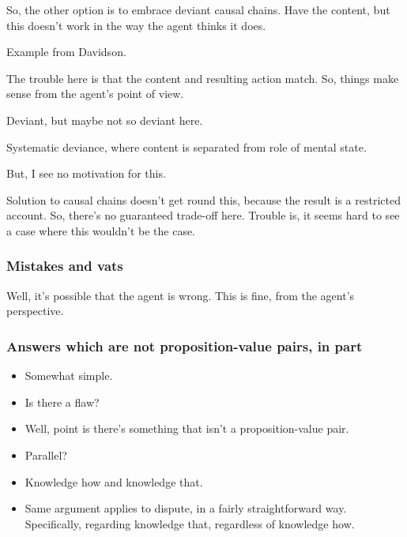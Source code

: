 \begin{note}
  So, the other option is to embrace deviant causal chains.
  Have the content, but this doesn't work in the way the agent thinks it does.

  Example from Davidson.

  The trouble here is that the content and resulting action match.
  So, things make sense from the agent's point of view.

  Deviant, but maybe not so deviant here.

  Systematic deviance, where content is separated from role of mental state.

  But, I see no motivation for this.

  Solution to causal chains doesn't get round this, because the result is a restricted account.
  So, there's no guaranteed trade-off here.
  Trouble is, it seems hard to see a case where this wouldn't be the case.
\end{note}

\subsubsection{Mistakes and vats}

\begin{note}
  Well, it's possible that the agent is wrong.
  This is fine, from the agent's perspective.
\end{note}


\subsubsection{Answers which are not proposition-value pairs, in part}
\label{sec:answers-which-are}

\begin{note}
  \begin{itemize}
  \item
    Somewhat simple.
  \item
    Is there a flaw?
  \item
    Well, point is there's something that isn't a proposition-value pair.
  \item
    Parallel?
  \item
    Knowledge how and knowledge that.
  \item
    Same argument applies to dispute, in a fairly straightforward way.
    Specifically, regarding knowledge that, regardless of knowledge how.
  \end{itemize}
\end{note}

